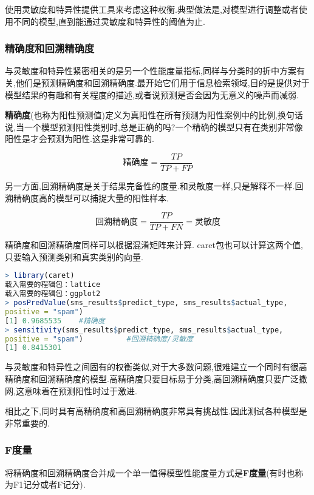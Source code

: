 \documentclass[11pt,a4paper,oneside]{book}
\begin{document}
使用灵敏度和特异性提供工具来考虑这种权衡.典型做法是,对模型进行调整或者使用不同的模型,直到能通过灵敏度和特异性的阈值为止.

\subsubsection{精确度和回溯精确度}

与灵敏度和特异性紧密相关的是另一个性能度量指标,同样与分类时的折中方案有关,他们是预测精确度和回溯精确度.最开始它们用于信息检索领域,目的是提供对于模型结果的有趣和有关程度的描述,或者说预测是否会因为无意义的噪声而减弱.

\textbf{精确度}(也称为阳性预测值)定义为真阳性在所有预测为阳性案例中的比例,换句话说,当一个模型预测阳性类别时,总是正确的吗?一个精确的模型只有在类别非常像阳性是才会预测为阳性.这是非常可靠的.

\begin{equation}
	\mbox{精确度}=\frac{TP}{TP+FP}
\end{equation}

另一方面,回溯精确度是关于结果完备性的度量.和灵敏度一样,只是解释不一样.回溯精确度高的模型可以捕捉大量的阳性样本.

\begin{equation}
	\mbox{回溯精确度}=\frac{TP}{TP+FN}=\mbox{灵敏度}
\end{equation}

精确度和回溯精确度同样可以根据混淆矩阵来计算. caret包也可以计算这两个值,只要输入预测类别和真实类别的向量.
\begin{lstlisting}[language=r]
> library(caret)
载入需要的程辑包：lattice
载入需要的程辑包：ggplot2
> posPredValue(sms_results$predict_type, sms_results$actual_type, 
positive = "spam")
[1] 0.9685535    #精确度
> sensitivity(sms_results$predict_type, sms_results$actual_type, 
positive = "spam")          #回溯精确度/灵敏度
[1] 0.8415301
\end{lstlisting}

与灵敏度和特异性之间固有的权衡类似,对于大多数问题,很难建立一个同时有很高精确度和回溯精确度的模型.高精确度只要目标易于分类,高回溯精确度只要广泛撒网,这意味着在预测阳性时过于激进.

相比之下,同时具有高精确度和高回溯精确度非常具有挑战性.因此测试各种模型是非常重要的.

\subsubsection{F度量}

将精确度和回溯精确度合并成一个单一值得模型性能度量方式是\textbf{F度量}(有时也称为F1记分或者F记分).
\end{document}
